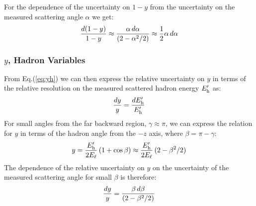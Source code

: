 \documentclass[12pt]{article}
\begin{document}
For the dependence of the uncertainty on $1-y$ from the uncertainty on the measured scattering angle $\alpha$  we get:
%
\begin{equation}
{d(1-y) \over 1-y} \approx {\alpha\, d\alpha \over (2-\alpha^2/2)} \approx {1 \over 2} \alpha\, d\alpha 
\end{equation}
%


\subsubsection{$y$, Hadron Variables}

From Eq.(\ref{eq:yh}) we can then express the relative uncertainty on $y$ in terms of the relative resolution on the measured scattered hadron energy $E^\prime_{\rm h}$ as:
%
\begin{equation}
{dy \over y} = {dE^\prime_{\rm h} \over E^\prime_{\rm h}}
\end{equation}
%
For small angles from the far backward region, $\gamma \approx \pi$, we can express the relation for $y$ in terms of the hadron angle from the $-z$ axis, where $\beta = \pi - \gamma$:
%
\begin{equation}
y = {E^\prime_{\rm h} \over 2 E_\ell} \, (1+\cos\beta) \approx {E^\prime_{\rm h} \over 2 E_\ell} \, (2-\beta^2/2)
\end{equation}
%
The dependence of the relative uncertainty on $y$ on the uncertainty of the measured scattering angle for small $\beta$ is therefore:
%
\begin{equation}
{dy \over y} = {\beta\, d\beta \over (2-\beta^2/2)}
\end{equation}
%

%
\end{document}
